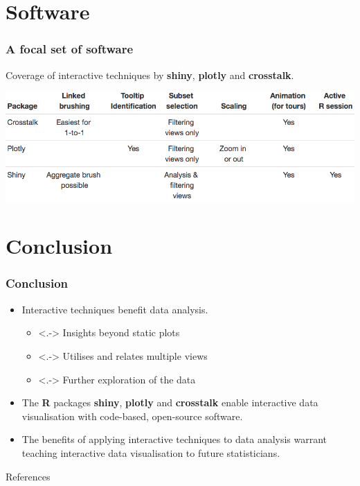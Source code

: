 \documentclass{beamer}
\begin{document}
\section{Software}
\label{sec:software}

\begin{frame}
		\frametitle{A focal set of software}
		Coverage of interactive techniques by \textbf{shiny}, \textbf{plotly} and \textbf{crosstalk}.
		\begin{center}
			\includegraphics[scale=0.37]{files/table.jpeg}
		\end{center}
\end{frame}

\section{Conclusion}
\label{sec:conclusion}

\begin{frame}
\frametitle{Conclusion}
	\begin{itemize}[<+->]
		\item Interactive techniques benefit data analysis.
		\begin{itemize} 
			\item <.-> Insights beyond static plots
			\item <.-> Utilises and relates multiple views 
			\item <.-> Further exploration of the data
		\end{itemize}
		\item The \textbf{R} packages \textbf{shiny}, \textbf{plotly} and \textbf{crosstalk} enable interactive data visualisation with code-based, open-source software.
		\item The benefits of applying interactive techniques to data analysis warrant teaching interactive data visualisation to future statisticians.
	\end{itemize}
\end{frame}

\begin{frame}[allowframebreaks]{References}
	
	
	\nocite{R}
	\nocite{plotly_R}
	\nocite{crosstalk_R}
	\nocite{shiny_R}
\end{frame}
\end{document}
